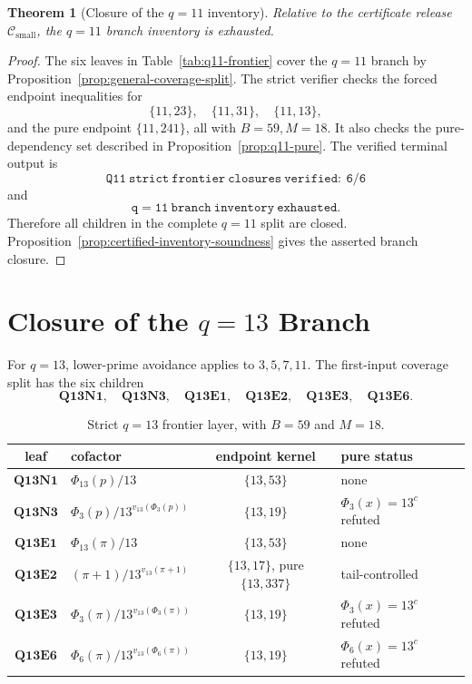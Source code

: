 \documentclass[11pt]{article}
\newtheorem{theorem}{Theorem}[section]
\theoremstyle{definition}
\theoremstyle{remark}
\newcommand{\Csmall}{\ensuremath{\mathcal C_{\mathrm{small}}}}
\begin{document}
\begin{theorem}[Closure of the \(q=11\) inventory]
\label{thm:q11-closed}
Relative to the certificate release \(\Csmall\), the \(q=11\) branch inventory is
exhausted.
\end{theorem}

\begin{proof}
The six leaves in Table~\ref{tab:q11-frontier} cover the \(q=11\) branch by
Proposition~\ref{prop:general-coverage-split}.  The strict verifier checks the
forced endpoint inequalities for
\[
  \{11,23\},\quad \{11,31\},\quad \{11,13\},
\]
and the pure endpoint \(\{11,241\}\), all with \(B=59,M=18\).  It also checks
the pure-dependency set described in Proposition~\ref{prop:q11-pure}.  The
verified terminal output is
\[
  \mathtt{Q11\ strict\ frontier\ closures\ verified:\ 6/6}
\]
and
\[
  \mathtt{q=11\ branch\ inventory\ exhausted}.
\]
Therefore all children in the complete \(q=11\) split are closed.
Proposition~\ref{prop:certified-inventory-soundness} gives the asserted
branch closure.
\end{proof}

\section{Closure of the \(q=13\) Branch}
\label{sec:q13}

For \(q=13\), lower-prime avoidance applies to \(3,5,7,11\).  The first-input
coverage split has the six children
\[
  \mathbf{Q13N1},\quad \mathbf{Q13N3},\quad
  \mathbf{Q13E1},\quad \mathbf{Q13E2},\quad
  \mathbf{Q13E3},\quad \mathbf{Q13E6}.
\]

\begin{table}[ht]
\centering
\small
\begin{tabularx}{\textwidth}{c|>{\raggedright\arraybackslash}X|c|>{\raggedright\arraybackslash}p{}}
\toprule
leaf & cofactor & endpoint kernel & pure status\\
\midrule
\(\mathbf{Q13N1}\) & \(\Phi_{13}(p)/13\) & \(\{13,53\}\) & none\\
\(\mathbf{Q13N3}\) & \(\Phi_3(p)/13^{v_{13}(\Phi_3(p))}\) & \(\{13,19\}\) & \(\Phi_3(x)=13^c\) refuted\\
\(\mathbf{Q13E1}\) & \(\Phi_{13}(\pi)/13\) & \(\{13,53\}\) & none\\
\(\mathbf{Q13E2}\) & \((\pi+1)/13^{v_{13}(\pi+1)}\) & \(\{13,17\}\), pure \(\{13,337\}\) & tail-controlled\\
\(\mathbf{Q13E3}\) & \(\Phi_3(\pi)/13^{v_{13}(\Phi_3(\pi))}\) & \(\{13,19\}\) & \(\Phi_3(x)=13^c\) refuted\\
\(\mathbf{Q13E6}\) & \(\Phi_6(\pi)/13^{v_{13}(\Phi_6(\pi))}\) & \(\{13,19\}\) & \(\Phi_6(x)=13^c\) refuted\\
\bottomrule
\end{tabularx}
\caption{Strict \(q=13\) frontier layer, with \(B=59\) and \(M=18\).}
\label{tab:q13-frontier}
\end{table}
\end{document}
